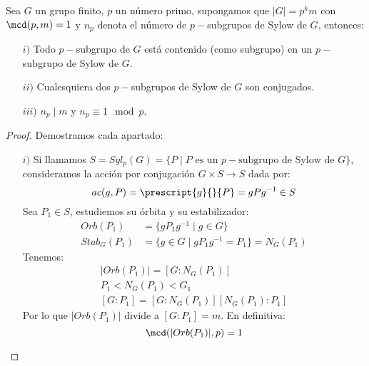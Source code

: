 \begin{teo}
    Sea $G$ un grupo finito, $p$ un número primo, supongamos que $|G| = p^k m$ con $\mcd(p,m) = 1$ y $n_p$ denota el número de $p-$subgrupos de Sylow de $G$, entonces:
    \begin{enumerate}
        \item[$i)$] Todo $p-$subgrupo de $G$ está contenido (como subgrupo) en un $p-$subgrupo de Sylow de $G$.
        \item[$ii)$] Cualesquiera dos $p-$subgrupos de Sylow de $G$ son conjugados.
        \item[$iii)$] $n_p \mid m$ y $n_p \equiv 1 \mod p$. 
    \end{enumerate}
    \begin{proof} %
        Demostramos cada apartado:
        \begin{enumerate}
            \item[$i)$] Si llamamos $S = Syl_p(G) = \{P \mid P \text{\ es un\ } p-\text{subgrupo\ de Sylow de\ } G\}$, consideramos la acción por conjugación $G\times S\to S$ dada por:
                \begin{equation*}
                    ac(g, P) = \prescript{g}{}{P} = gPg^{-1} \in S
                \end{equation*}
                Sea $P_1\in S$, estudiemos su órbita y su estabilizador:
                \begin{align*}
                    Orb(P_1) &= \{gP_1g^{-1}\mid g\in G\} \\
                    Stab_G(P_1) &= \{g\in G \mid gP_1g^{-1} = P_1\} = N_G(P_1)
                \end{align*}
                Tenemos:
                \begin{gather*}
                    |Orb(P_1)| = [G:N_G(P_1)] \\
                    P_1 < N_G(P_1) < G_1 \\
                    [G:P_1] = [G:N_G(P_1)] [N_G(P_1):P_1]
                \end{gather*}
                Por lo que $|Orb(P_1)|$ divide a $[G:P_1] = m$. En definitiva:
                \begin{equation*}
                    \mcd(|Orb(P_1)|, p) = 1
                \end{equation*}


\end{enumerate}
\end{proof}
\end{teo}
